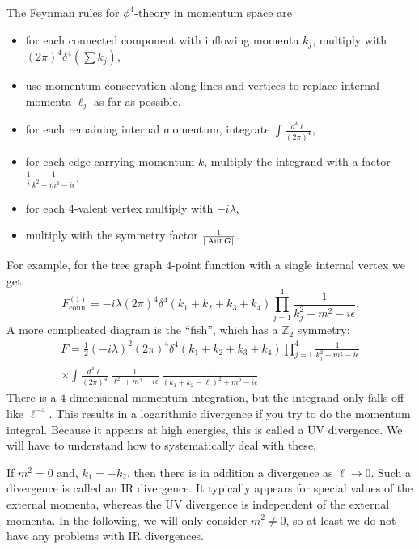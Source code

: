 \documentclass[12pt]{article}
\begin{document}
\begin{definition}
  The Feynman rules for $\phi^4$-theory in momentum space are
  \begin{itemize}
  \item for each connected component with inflowing momenta $k_j$,
    multiply with $(2\pi)^4 \delta^4(\sum k_j)$,
  \item use momentum conservation along lines and vertices to replace
    internal momenta $\ell_j$ as far as possible,
  \item for each remaining internal momentum, integrate $\int
    \frac{d^4\ell}{(2\pi)^4}$,
  \item
    for each edge carrying momentum $k$, multiply the integrand with a factor
    $\frac{1}{i} \frac{1}{k^2+m^2-i \epsilon}$,
  \item for each 4-valent vertex multiply with $-i\lambda$,
  \item multiply with the symmetry factor $\frac{1}{|\operatorname{Aut} G|}$.
  \end{itemize}
\end{definition}
For example, for the tree graph $4$-point function with a single
internal vertex we get
\begin{equation}
  F^{(1)}_\text{conn} = 
  -i \lambda (2\pi)^4 \delta^4(k_1+k_2+k_3+k_4) \prod_{j=1}^4
  \frac{1}{k_j^2+m^2-i \epsilon}. 
\end{equation}
A more complicated diagram is the ``fish'', which has a $\mathbb{Z}_2$
symmetry:
\begin{multline}
  F = 
  \frac{1}{2}
  (-i\lambda)^2
  (2\pi)^4 \delta^4(k_1+k_2+k_3+k_4) 
  \prod_{j=1}^4 \frac{1}{k_j^2+m^2-i \epsilon}
  \\
  \times
  \int \frac{d^4\ell}{(2\pi)^4}~
  \frac{1}{\ell^2 + m^2 -i\epsilon}~
  \frac{1}{(k_1+k_2-\ell)^2 + m^2 -i\epsilon}
\end{multline}
There is a $4$-dimensional momentum integration, but the integrand
only falls off like $\ell^{-4}$. This results in a logarithmic
divergence if you try to do the momentum integral. Because it appears
at high energies, this is called a UV divergence. We will have to
understand how to systematically deal with these.

If $m^2=0$ and, $k_1=-k_2$, then there is in addition a divergence as
$\ell\to 0$. Such a divergence is called an IR divergence. It
typically appears for special values of the external momenta, whereas
the UV divergence is independent of the external momenta. In the
following, we will only consider $m^2\not=0$, so at least we do not
have any problems with IR divergences.
\end{document}
